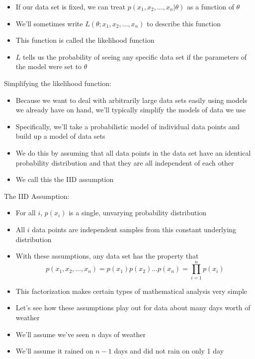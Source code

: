 \documentclass{beamer}
\begin{document}
\frame
{
  \begin{itemize}
    \item{If our data set is fixed, we can treat $p(x_1, x_2, \ldots, x_n | \theta)$ as a function of $\theta$}
    \item{We'll sometimes write $L(\theta; x_1, x_2, \ldots, x_n)$ to describe this function}
    \item{This function is called the likelihood function}
    \item{$L$ tells us the probability of seeing any specific data set if the parameters of the model were set to $\theta$}
  \end{itemize}
}

\frame
{
  Simplifying the likelihood function:
  \begin{itemize}
    \item{Because we want to deal with arbitrarily large data sets easily using models we already have on hand, we'll typically simplify the models of data we use}
    \item{Specifically, we'll take a probabilistic model of individual data points and build up a model of data sets}
    \item{We do this by assuming that all data points in the data set have an identical probability distribution and that they are all independent of each other}
    \item{We call this the IID assumption}
  \end{itemize}
}

\frame
{
  The IID Assumption:
  \begin{itemize}
    \item{For all $i$, $p(x_i)$ is a single, unvarying probability distribution}
    \item{All $i$ data points are independent samples from this constant underlying distribution}
    \item{With these assumptions, any data set has the property that}
    \[
      p(x_1, x_2, \ldots, x_n) = p(x_1) p(x_2) \ldots p(x_n) = \prod_{i = 1}^{n} p(x_i)
    \]
    \item{This factorization makes certain types of mathematical analysis very simple}
  \end{itemize}
}

\frame
{
  \begin{itemize}
    \item{Let's see how these assumptions play out for data about many days worth of weather}
    \item{We'll assume we've seen $n$ days of weather}
    \item{We'll assume it rained on $n - 1$ days and did not rain on only 1 day}
  \end{itemize}
}
\end{document}
